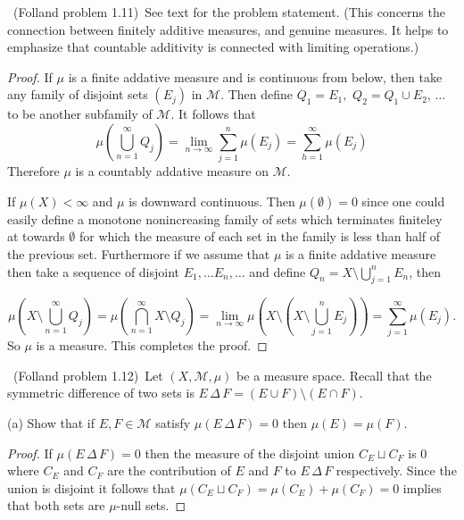 \documentclass[11pt]{amsart}
\def\symdif{\,\Delta\,}
\def\scriptm{{\mathcal M}}
\begin{document}
\medskip {}\ 
(Folland problem 1.11)\
See text for the problem statement.
(This concerns the connection between finitely additive measures, and genuine measures.
It helps to emphasize that countable additivity is connected with limiting operations.)
\begin{proof}
	If $\mu$ is a finite addative measure and is continuous from below, then take any family of disjoint sets $(E_j)$ in $\scriptm$. Then define $Q_1 = E_1,$ $Q_2 = Q_1 \cup E_2$, $\dots$ to be another subfamily of $\scriptm$. It follows that 
	\begin{equation*}
		\mu\left(\bigcup_{n=1}^\infty Q_j\right) = \lim_{n\to\infty} \sum_{j=1}^n \mu(E_j) = \sum_{h=1}^\infty \mu(E_j)
	\end{equation*}
	Therefore $\mu$ is a countably addative measure on $\scriptm$.

	If $ \mu(X) < \infty$ and $\mu$ is downward continuous. Then $\mu(\emptyset) = 0$ since one could easily define a monotone nonincreasing family of sets which terminates finiteley at towards $\emptyset$ for which the measure of each set in the family is less than half of the previous set. Furthermore if we assume that $\mu$ is a finite addative measure then take a sequence of disjoint $E_1, \dots E_n, \dots $ and define $Q_n = X \setminus \bigcup_{j=1}^n E_n$, then 
	
	\begin{equation*}
			\mu\left(X \setminus \bigcup_{n=1}^\infty Q_j\right) = \mu\left(\bigcap_{n=1}^\infty X \setminus Q_j\right) = \lim_{n\to\infty}  \mu\left(X \setminus \left(X \setminus \bigcup_{j=1}^nE_j\right)\right) = \sum_{j=1}^\infty \mu(E_j).
	\end{equation*}
	So $\mu$ is a measure. This completes the proof.
\end{proof}

\medskip {}\ 
(Folland problem 1.12)\
Let $(X,\scriptm,\mu)$ be a measure space. Recall that the symmetric difference of two sets
is $E\symdif F = (E\cup F)\setminus (E\cap F)$.

(a) Show that if $E,F\in\scriptm$ satisfy $\mu(E\symdif F)=0$
then $\mu(E)=\mu(F)$.
\begin{proof}
	If $\mu(E \symdif F) = 0$ then the measure of the disjoint union $C_E \sqcup C_F$ is $0$ where $C_E$ and $C_F$ are the contribution of $E$ and $F$ to $E \symdif F$ respectively. Since the union is disjoint it follows that $\mu(C_E \sqcup C_F) = \mu(C_E) + \mu(C_F) = 0$ implies that both sets are $\mu$-null sets.
\end{proof}
\end{document}
